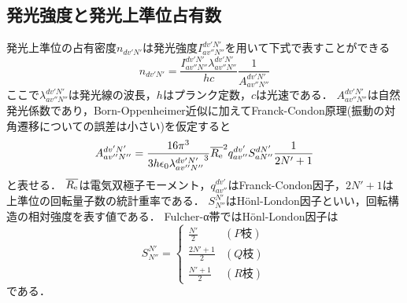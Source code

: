 \subsection{発光強度と発光上準位占有数}
発光上準位の占有密度$n_{dv'N'}$は発光強度$I^{dv'N'}_{av''N''}$を用いて下式で表すことができる
\begin{equation}
    n_{dv'N'}=\frac{I^{dv'N'}_{av''N''}\lambda^{dv'N'}_{av''N''}}{hc}\frac{1}{A^{dv'N'}_{av''N''}}
\end{equation}
ここで$\lambda^{dv'N'}_{av''N''}$は発光線の波長，$h$はプランク定数，$c$は光速である．
$A^{dv'N'}_{av''N''}$は自然発光係数であり，Born-Oppenheimer近似に加えてFranck-Condon原理(振動の対角遷移についての誤差は小さい)を仮定すると
\begin{equation}
    A^{dv'N'}_{av''N''} = \frac{16 \pi^3}{3h \epsilon_0 {\lambda^{dv'N'}_{av''N''}}^3 } \overline{R_{\rm e}}^2 q^{dv'}_{av''} S^{dN'}_{aN''} \frac{1}{2N'+1}
\end{equation}
と表せる\cite{PRnoijousei}．
$\overline{R_{\rm e}}$は電気双極子モーメント，$q^{dv'}_{av''}$はFranck-Condon因子，$2N'+1$は上準位の回転量子数の統計重率である．
$S^{N'}_{N''}$はH\"{o}nl-London因子といい，回転構造の相対強度を表す値である．
Fulcher-α帯ではH\"{o}nl-London因子は
\begin{equation}
    S^{N'}_{N''} = \begin{cases}
        \frac{N'}{2} & (P枝)\\
        \frac{2N'+1}{2} & (Q枝)\\
        \frac{N'+1}{2} & (R枝)
    \end{cases}
\end{equation}
である\cite{PRnoijousei}．

